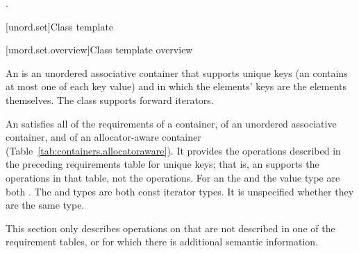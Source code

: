 \begin{itemdescr}
\pnum\effects {}.
\end{itemdescr}

[unord.set]{Class template }%

[unord.set.overview]{Class template  overview}

\pnum
{}%
%
An  is an unordered associative container that
supports unique keys (an  contains at most one of each
key value) and in which the elements' keys are the elements
themselves.
The  class
supports forward iterators.

\pnum
An  satisfies all of the requirements of a container, of an unordered associative container, and of an allocator-aware container (Table~\ref{tab:containers.allocatoraware}). It provides the operations described in the preceding requirements table for unique keys; that is, an  supports the  operations in that table, not the  operations. For an  the  and the value type are both . The  and  types are both const iterator types. It is unspecified whether they are the same type.

\pnum
This section only describes operations on  that
are not described in one of the requirement tables, or for which there
is additional semantic information.


